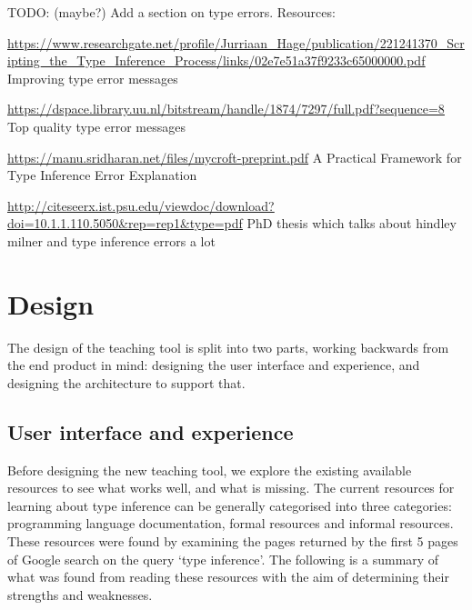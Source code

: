 \documentclass[a4paper,fleqn,oneside,12pt]{report}
\begin{document}
TODO: (maybe?) Add a section on type errors. Resources:

\underline{\href{https://www.researchgate.net/profile/Jurriaan\_Hage/publication/221241370\_Scripting\_the\_Type\_Inference\_Process/links/02e7e51a37f9233c65000000.pdf}{https://www.researchgate.net/profile/Jurriaan\_Hage/publication/221241370\_Scripting\_the\_Type\_Inference\_Process/links/02e7e51a37f9233c65000000.pdf}}
Improving type error messages

\underline{\href{https://dspace.library.uu.nl/bitstream/handle/1874/7297/full.pdf?sequence=8}{https://dspace.library.uu.nl/bitstream/handle/1874/7297/full.pdf?sequence=8}}
Top quality type error messages

\underline{\href{https://manu.sridharan.net/files/mycroft-preprint.pdf}{https://manu.sridharan.net/files/mycroft-preprint.pdf}}
A Practical Framework for Type Inference Error Explanation

\underline{\href{http://citeseerx.ist.psu.edu/viewdoc/download?doi=10.1.1.110.5050\&rep=rep1\&type=pdf}{http://citeseerx.ist.psu.edu/viewdoc/download?doi=10.1.1.110.5050\&rep=rep1\&type=pdf}}
PhD thesis which talks about hindley milner and type inference errors a lot

\chapter{Design}\label{id:h.7ggvdxb04tzm}

The design of the teaching tool is split into two parts, working backwards from the end product in mind: designing the user interface and experience, and designing the architecture to support that.

\section{User interface and experience}\label{id:h.dr046u473e01}

Before designing the new teaching tool, we explore the existing available resources to see what works well, and what is missing. The current resources for learning about type inference can be generally categorised into three categories: programming language documentation, formal resources and informal resources. These resources were found by examining the pages returned by the first 5 pages of Google search on the query ‘type inference’. The following is a summary of what was found from reading these resources with the aim of determining their strengths and weaknesses.
\end{document}
